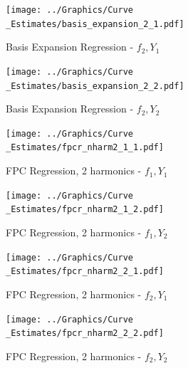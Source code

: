 \documentclass[11pt,twoside,a4paper]{article}
\begin{document}
	\begin{figure}[H]
		\centering
		\begin{minipage}{.5\textwidth}
			\centering
			\texttt{[image: ../Graphics/Curve\\\_Estimates/basis\_expansion\_2\_1.pdf]}
			\caption{Basis Expansion Regression - $f_2, Y_1$}
			\label{basis_expansion_2_1}
		\end{minipage}%
		\begin{minipage}{.5\textwidth}
			\centering
			\texttt{[image: ../Graphics/Curve\\\_Estimates/basis\_expansion\_2\_2.pdf]}
			\caption{Basis Expansion Regression - $f_2, Y_2$}
			\label{basis_expansion_2_2}
		\end{minipage}
	\end{figure}
	
	\begin{figure}[H]
		\centering
		\begin{minipage}{.5\textwidth}
			\centering
			\texttt{[image: ../Graphics/Curve\\\_Estimates/fpcr\_nharm2\_1\_1.pdf]}
			\caption{FPC Regression, 2 harmonics - $f_1, Y_1$}
			\label{fpcr_nharm2_1_1}
		\end{minipage}%
		\begin{minipage}{.5\textwidth}
			\centering
			\texttt{[image: ../Graphics/Curve\\\_Estimates/fpcr\_nharm2\_1\_2.pdf]}
			\caption{FPC Regression, 2 harmonics - $f_1, Y_2$}
			\label{fpcr_nharm2_1_2}
			
		\end{minipage}
	\end{figure}
	
	\begin{figure}[H]
		\centering
		\begin{minipage}{.5\textwidth}
			\centering
			\texttt{[image: ../Graphics/Curve\\\_Estimates/fpcr\_nharm2\_2\_1.pdf]}
			\caption{FPC Regression, 2 harmonics - $f_2, Y_1$}
			\label{fpcr_nharm2_2_1}
		\end{minipage}%
		\begin{minipage}{.5\textwidth}
			\centering
			\texttt{[image: ../Graphics/Curve\\\_Estimates/fpcr\_nharm2\_2\_2.pdf]}
			\caption{FPC Regression, 2 harmonics - $f_2, Y_2$}
			\label{fpcr_nharm2_2_2}
		\end{minipage}
	\end{figure}
	
\end{document}
